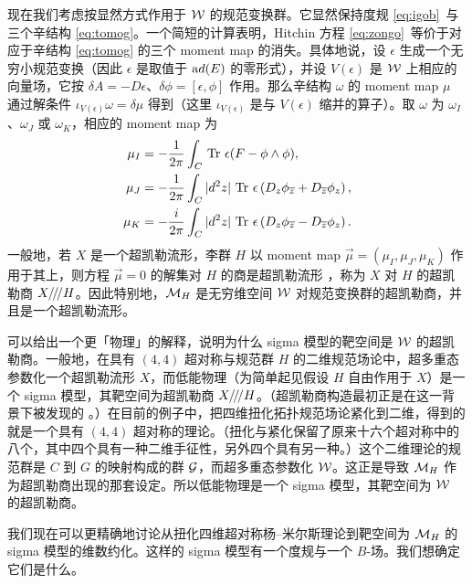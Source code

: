 现在我们考虑按显然方式作用于 $\EUW$ 的规范变换群。它显然保持度规 \eqref{eq:igob}\ 与三个辛结构 \eqref{eq:tomog}。一个简短的计算表明，Hitchin 方程 \eqref{eq:zongo}\ 等价于对应于辛结构 \eqref{eq:tomog} 的三个 moment map 的消失。具体地说，设 $\epsilon$ 生成一个无穷小规范变换（因此 $\epsilon$ 是取值于 ${\rm ad}(E)$ 的零形式），并设 $V(\epsilon)$ 是 $\EUW$ 上相应的向量场，它按 $\delta A=-D\epsilon$、$\delta\phi=[\epsilon,\phi]$ 作用。那么辛结构 $\omega$ 的 moment map $\mu$ 通过解条件 $\iota_{V(\epsilon)}\omega=\delta\mu$ 得到（这里 $\iota_{V(\epsilon)}$ 是与 $V(\epsilon)$ 缩并的算子）。取 $\omega$ 为 $\omega_I$、$\omega_J$ 或 $\omega_K$，相应的 moment map 为
\setcounter{equation}{10}
\begin{equation}\label{eq:joget}
\begin{aligned}\mu_I & =-{1\over
2\pi}\int_C\,\Tr\,\epsilon(F-\phi\wedge \phi),\\ \mu_J &
=-{1\over 2\pi}\int_C|d^2z|\,\Tr\,\epsilon\left(D_z\phi_{\bar
z}+D_{\bar z}\phi_z\right), \\ \mu_K& = -{i\over
2\pi}\int_C|d^2z|\,\Tr\,\epsilon\left(D_z\phi_{\bar z}-D_{\bar
z}\phi_z\right).\\\end{aligned}
\end{equation}
一般地，若 $X$ 是一个超凯勒流形，李群 $H$ 以 moment map $\vec\mu=(\mu_I,\mu_J,\mu_K)$ 作用于其上，则方程 $\vec\mu=0$ 的解集对 $H$ 的商是超凯勒流形 \cite{ref61}，称为 $X$ 对 $H$ 的超凯勒商 $X/\negthinspace/\negthinspace/H$。因此特别地，$\M_H$ 是无穷维空间 ${\EUW}$ 对规范变换群的超凯勒商，并且是一个超凯勒流形。

可以给出一个更「物理」的解释，说明为什么 sigma 模型的靶空间是 $\EUW$ 的超凯勒商。一般地，在具有 $(4,4)$ 超对称与规范群 $H$ 的二维规范场论中，超多重态参数化一个超凯勒流形 $X$，而低能物理（为简单起见假设 $H$ 自由作用于 $X$）是一个 sigma 模型，其靶空间为超凯勒商 $X/\negthinspace/\negthinspace/H$。（超凯勒商构造最初正是在这一背景下被发现的 \cite{ref61}。）在目前的例子中，把四维扭化拓扑规范场论紧化到二维，得到的就是一个具有 $(4,4)$ 超对称的理论。（扭化与紧化保留了原来十六个超对称中的八个，其中四个具有一种二维手征性，另外四个具有另一种。）这个二维理论的规范群是 $C$ 到 $G$ 的映射构成的群 ${\cal G}$，而超多重态参数化 $\EUW$。这正是导致 $\MH$ 作为超凯勒商出现的那套设定。所以低能物理是一个 sigma 模型，其靶空间为 $\EUW$ 的超凯勒商。

\par{}

我们现在可以更精确地讨论从扭化四维超对称杨--米尔斯理论到靶空间为 $\MH$ 的 sigma 模型的维数约化。这样的 sigma 模型有一个度规与一个 $B$-场。我们想确定它们是什么。

